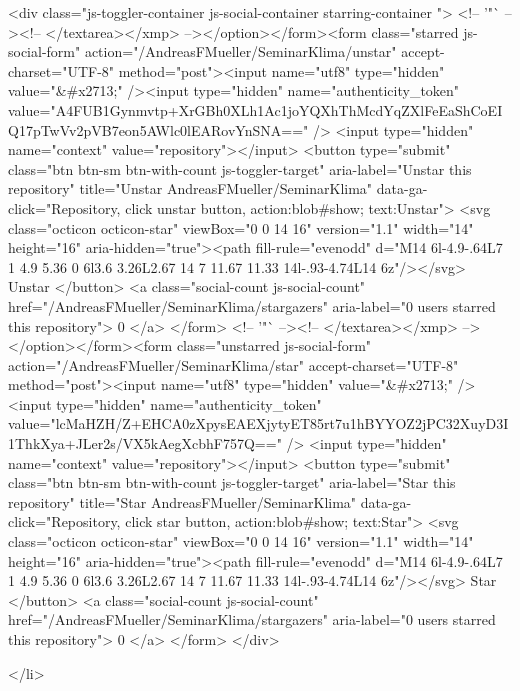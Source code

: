  <div class="js-toggler-container js-social-container starring-container ">
    <!-- '"` --><!-- </textarea></xmp> --></option></form><form class="starred js-social-form" action="/AndreasFMueller/SeminarKlima/unstar" accept-charset="UTF-8" method="post"><input name="utf8" type="hidden" value="&#x2713;" /><input type="hidden" name="authenticity_token" value="A4FUB1Gynmvtp+XrGBh0XLh1Ac1joYQXhThMcdYqZXlFeEaShCoEIQ17pTwVv2pVB7eon5AWlc0lEARovYnSNA==" />
      <input type="hidden" name="context" value="repository"></input>
      <button
        type="submit"
        class="btn btn-sm btn-with-count js-toggler-target"
        aria-label="Unstar this repository" title="Unstar AndreasFMueller/SeminarKlima"
        data-ga-click="Repository, click unstar button, action:blob#show; text:Unstar">
        <svg class="octicon octicon-star" viewBox="0 0 14 16" version="1.1" width="14" height="16" aria-hidden="true"><path fill-rule="evenodd" d="M14 6l-4.9-.64L7 1 4.9 5.36 0 6l3.6 3.26L2.67 14 7 11.67 11.33 14l-.93-4.74L14 6z"/></svg>
        Unstar
      </button>
        <a class="social-count js-social-count" href="/AndreasFMueller/SeminarKlima/stargazers"
           aria-label="0 users starred this repository">
          0
        </a>
</form>
    <!-- '"` --><!-- </textarea></xmp> --></option></form><form class="unstarred js-social-form" action="/AndreasFMueller/SeminarKlima/star" accept-charset="UTF-8" method="post"><input name="utf8" type="hidden" value="&#x2713;" /><input type="hidden" name="authenticity_token" value="lcMaHZH/Z+EHCA0zXpysEAEXjytyET85rt7u1hBYYOZ2jPC32XuyD3I1ThkXya+JLer2s/VX5kAegXcbhF757Q==" />
      <input type="hidden" name="context" value="repository"></input>
      <button
        type="submit"
        class="btn btn-sm btn-with-count js-toggler-target"
        aria-label="Star this repository" title="Star AndreasFMueller/SeminarKlima"
        data-ga-click="Repository, click star button, action:blob#show; text:Star">
        <svg class="octicon octicon-star" viewBox="0 0 14 16" version="1.1" width="14" height="16" aria-hidden="true"><path fill-rule="evenodd" d="M14 6l-4.9-.64L7 1 4.9 5.36 0 6l3.6 3.26L2.67 14 7 11.67 11.33 14l-.93-4.74L14 6z"/></svg>
        Star
      </button>
        <a class="social-count js-social-count" href="/AndreasFMueller/SeminarKlima/stargazers"
           aria-label="0 users starred this repository">
          0
        </a>
</form>  </div>

  </li>

